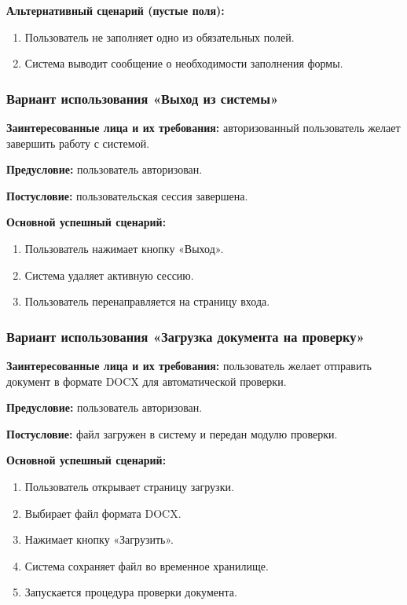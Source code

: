\textbf{Альтернативный сценарий (пустые поля):}

\begin{enumerate}
	\item Пользователь не заполняет одно из обязательных полей.
	\item Система выводит сообщение о необходимости заполнения формы.
\end{enumerate}

\subsubsection{Вариант использования «Выход из системы»}

\textbf{Заинтересованные лица и их требования:} авторизованный пользователь желает завершить работу с системой.

\textbf{Предусловие:} пользователь авторизован.

\textbf{Постусловие:} пользовательская сессия завершена.

\textbf{Основной успешный сценарий:}

\begin{enumerate}
	\item Пользователь нажимает кнопку «Выход».
	\item Система удаляет активную сессию.
	\item Пользователь перенаправляется на страницу входа.
\end{enumerate}

\subsubsection{Вариант использования «Загрузка документа на проверку»}

\textbf{Заинтересованные лица и их требования:} пользователь желает отправить документ в формате DOCX для автоматической проверки.

\textbf{Предусловие:} пользователь авторизован.

\textbf{Постусловие:} файл загружен в систему и передан модулю проверки.

\textbf{Основной успешный сценарий:}

\begin{enumerate}
	\item Пользователь открывает страницу загрузки.
	\item Выбирает файл формата DOCX.
	\item Нажимает кнопку «Загрузить».
	\item Система сохраняет файл во временное хранилище.
	\item Запускается процедура проверки документа.
\end{enumerate}

